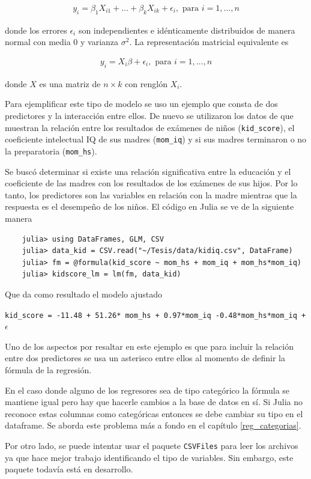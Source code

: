 \begin{equation*}
    \begin{aligned}
    y_i = \beta_1 X_{i1} + \dots + \beta_k X_{ik} + \epsilon_i, \text{ para } i = 1, \dots, n
    \end{aligned}
\end{equation*}

\noindent donde los errores $\epsilon_i$ son independientes e idénticamente distribuidos de manera normal con media 0 y varianza $\sigma^2$. La representación matricial equivalente es 

\begin{equation} \label{eq_rlm}
    \begin{aligned}
        y_i = X_i \beta + \epsilon_i, \text{ para } i = 1, \dots, n
    \end{aligned}
\end{equation}

\noindent donde $X$ es una matriz de $n \times k$ con renglón $X_i$.

Para ejemplificar este tipo de modelo se uso un ejemplo que consta de dos predictores y la interacción entre ellos. De nuevo se utilizaron los datos de \cite{regression_other_stories} que muestran la relación entre los resultados de exámenes de niños (\texttt{kid\_score}), el coeficiente intelectual IQ de sus madres (\texttt{mom\_iq}) y si sus madres terminaron o no la preparatoria (\texttt{mom\_hs}). 

Se buscó determinar si existe una relación significativa entre la educación y el coeficiente de las madres con los resultados de los exámenes de sus hijos. Por lo tanto, los predictores son las variables en relación con la madre mientras que la respuesta es el desempeño de los niños. El código en \textsf{Julia} se ve de la siguiente manera

\begin{verbatim}
    julia> using DataFrames, GLM, CSV
    julia> data_kid = CSV.read("~/Tesis/data/kidiq.csv", DataFrame)
	julia> fm = @formula(kid_score ~ mom_hs + mom_iq + mom_hs*mom_iq)
	julia> kidscore_lm = lm(fm, data_kid)
\end{verbatim}

Que da como resultado el modelo ajustado

\texttt{kid\_score = -11.48 + 51.26* mom\_hs + 0.97*mom\_iq -0.48*mom\_hs*mom\_iq + $\epsilon$}

Uno de los aspectos por resaltar en este ejemplo es que para incluir la relación entre dos predictores se usa un asterisco entre ellos al momento de definir la fórmula de la regresión. 

En el caso donde alguno de los regresores sea de tipo categórico la fórmula se mantiene igual pero hay que hacerle cambios a la base de datos en sí. Si \textsf{Julia} no reconoce estas columnas como categóricas entonces se debe cambiar su tipo en el dataframe. Se aborda este problema más a fondo en el capítulo \ref{reg_categorias}. 

Por otro lado, se puede intentar usar el paquete \texttt{CSVFiles} para leer los archivos ya que hace mejor trabajo identificando el tipo de variables. Sin embargo, este paquete todavía está en desarrollo. 
